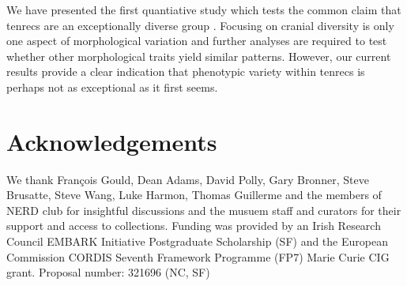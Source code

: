 \documentclass[12pt,a4paper]{article}
\begin{document}
  

	
	We have presented the first quantiative study which tests the common claim that tenrecs are an exceptionally diverse group \citep{Olson2013, Soarimalala2011,Eisenberg1969}. Focusing on cranial diversity is only one aspect of morphological variation and further analyses are required to test whether other morphological traits yield similar patterns. However, our current results provide a clear indication that phenotypic variety within tenrecs is perhaps not as exceptional as it first seems.
	
\section*{Acknowledgements}

	We thank Fran\c{c}ois Gould, Dean Adams, David Polly, Gary Bronner, Steve Brusatte, Steve Wang, Luke Harmon, Thomas Guillerme and the members of NERD club for insightful discussions and the musuem staff and curators for their support and access to collections. Funding was provided by an Irish Research Council EMBARK Initiative Postgraduate Scholarship (SF) and the European Commission CORDIS Seventh Framework Programme (FP7) Marie Curie CIG grant. Proposal number: 321696 (NC, SF)





\end{document}
